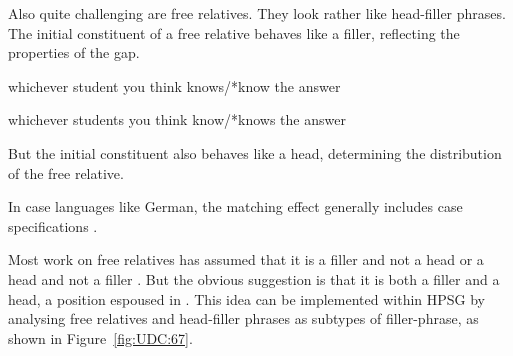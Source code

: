 \documentclass[output=paper
	        ,collection
	        ,collectionchapter
 	        ,biblatex
                ,babelshorthands
                ,newtxmath
                ,draftmode
                ,colorlinks, citecolor=brown
]{langscibook}
\begin{document}
{Also quite challenging are free relatives. They look rather like
head-filler phrases. The initial constituent of a free relative behaves
like a filler, reflecting the properties of the gap.

\begin{exe}
\ex \label{ex:UDC:63}
whichever student you think knows/*know the answer
\end{exe}

\begin{exe}
\ex \label{ex:UDC:64}
whichever students you think know/*knows the answer
\end{exe}

\noindent
But the initial constituent also behaves like a head, determining the
distribution of the free relative.

\begin{exe}
\ex \label{ex:UDC:65}
\begin{xlist}
  
\end{xlist}
\end{exe}


\begin{exe}
\ex \label{ex:UDC:66}
\begin{xlist}
\end{xlist}
\end{exe}

\noindent
In case languages like German, the matching effect generally includes case
specifications \citep{Mueller:99a}. %

Most work on free relatives has
assumed that it is a filler and not a head
\citep{Groos:Riemsdijk:81,Grosu:2003} or a head and not a filler
\citep{Bresnan:Grimshaw:78}. But the obvious suggestion is that it is
both a filler and a head, a position espoused in
\citet{Huddleston02}. This idea can be implemented within HPSG by
analysing free relatives and head-filler phrases as subtypes of
filler-phrase, as shown in Figure~\ref{fig:UDC:67}.


\begin{figure}[htb]
  \centering


\end{figure}}
\end{document}
